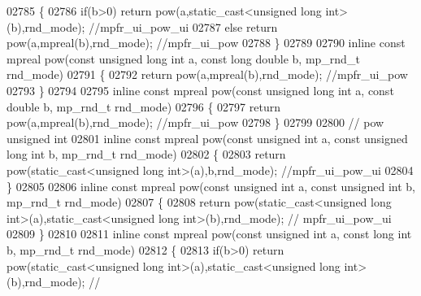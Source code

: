 \begin{DoxyCode}
{{02785 \{
02786     \textcolor{keywordflow}{if}(b>0)    \textcolor{keywordflow}{return} pow(a,static\_cast<unsigned long int>(b),rnd\_mode); \textcolor{comment}{//mpfr\_ui\_pow\_ui}
02787     \textcolor{keywordflow}{else}       \textcolor{keywordflow}{return} pow(a,mpreal(b),rnd\_mode); \textcolor{comment}{//mpfr\_ui\_pow}
02788 \}
02789 
02790 \textcolor{keyword}{inline} \textcolor{keyword}{const} mpreal pow(\textcolor{keyword}{const} \textcolor{keywordtype}{unsigned} \textcolor{keywordtype}{long} \textcolor{keywordtype}{int} a, \textcolor{keyword}{const} \textcolor{keywordtype}{long} \textcolor{keywordtype}{double} b, mp\_rnd\_t rnd\_mode)
02791 \{
02792     \textcolor{keywordflow}{return} pow(a,mpreal(b),rnd\_mode); \textcolor{comment}{//mpfr\_ui\_pow}
02793 \}
02794 
02795 \textcolor{keyword}{inline} \textcolor{keyword}{const} mpreal pow(\textcolor{keyword}{const} \textcolor{keywordtype}{unsigned} \textcolor{keywordtype}{long} \textcolor{keywordtype}{int} a, \textcolor{keyword}{const} \textcolor{keywordtype}{double} b, mp\_rnd\_t rnd\_mode)
02796 \{
02797     \textcolor{keywordflow}{return} pow(a,mpreal(b),rnd\_mode); \textcolor{comment}{//mpfr\_ui\_pow}
02798 \}
02799 
02800 \textcolor{comment}{// pow unsigned int}
02801 \textcolor{keyword}{inline} \textcolor{keyword}{const} mpreal pow(\textcolor{keyword}{const} \textcolor{keywordtype}{unsigned} \textcolor{keywordtype}{int} a, \textcolor{keyword}{const} \textcolor{keywordtype}{unsigned} \textcolor{keywordtype}{long} \textcolor{keywordtype}{int} b, mp\_rnd\_t rnd\_mode)
02802 \{
02803     \textcolor{keywordflow}{return} pow(static\_cast<unsigned long int>(a),b,rnd\_mode); \textcolor{comment}{//mpfr\_ui\_pow\_ui}
02804 \}
02805 
02806 \textcolor{keyword}{inline} \textcolor{keyword}{const} mpreal pow(\textcolor{keyword}{const} \textcolor{keywordtype}{unsigned} \textcolor{keywordtype}{int} a, \textcolor{keyword}{const} \textcolor{keywordtype}{unsigned} \textcolor{keywordtype}{int} b, mp\_rnd\_t rnd\_mode)
02807 \{
02808     \textcolor{keywordflow}{return} pow(static\_cast<unsigned long int>(a),static\_cast<unsigned long int>(b),rnd\_mode); \textcolor{comment}{//
      mpfr\_ui\_pow\_ui}
02809 \}
02810 
02811 \textcolor{keyword}{inline} \textcolor{keyword}{const} mpreal pow(\textcolor{keyword}{const} \textcolor{keywordtype}{unsigned} \textcolor{keywordtype}{int} a, \textcolor{keyword}{const} \textcolor{keywordtype}{long} \textcolor{keywordtype}{int} b, mp\_rnd\_t rnd\_mode)
02812 \{
02813     \textcolor{keywordflow}{if}(b>0) \textcolor{keywordflow}{return} pow(static\_cast<unsigned long int>(a),static\_cast<unsigned long int>(b),rnd\_mode); \textcolor{comment}{//
}}}
\end{DoxyCode}
